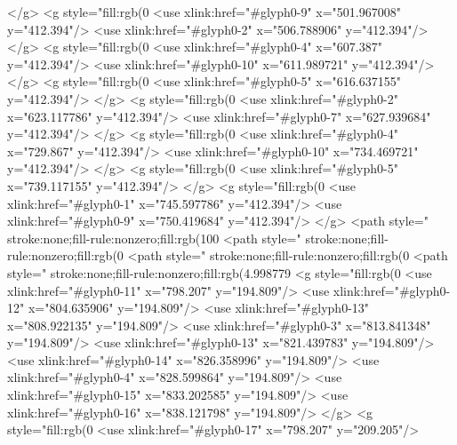 </g>
<g style="fill:rgb(0%
  <use xlink:href="#glyph0-9" x="501.967008" y="412.394"/>
  <use xlink:href="#glyph0-2" x="506.788906" y="412.394"/>
</g>
<g style="fill:rgb(0%
  <use xlink:href="#glyph0-4" x="607.387" y="412.394"/>
  <use xlink:href="#glyph0-10" x="611.989721" y="412.394"/>
</g>
<g style="fill:rgb(0%
  <use xlink:href="#glyph0-5" x="616.637155" y="412.394"/>
</g>
<g style="fill:rgb(0%
  <use xlink:href="#glyph0-2" x="623.117786" y="412.394"/>
  <use xlink:href="#glyph0-7" x="627.939684" y="412.394"/>
</g>
<g style="fill:rgb(0%
  <use xlink:href="#glyph0-4" x="729.867" y="412.394"/>
  <use xlink:href="#glyph0-10" x="734.469721" y="412.394"/>
</g>
<g style="fill:rgb(0%
  <use xlink:href="#glyph0-5" x="739.117155" y="412.394"/>
</g>
<g style="fill:rgb(0%
  <use xlink:href="#glyph0-1" x="745.597786" y="412.394"/>
  <use xlink:href="#glyph0-9" x="750.419684" y="412.394"/>
</g>
<path style=" stroke:none;fill-rule:nonzero;fill:rgb(100%
<path style=" stroke:none;fill-rule:nonzero;fill:rgb(0%
<path style=" stroke:none;fill-rule:nonzero;fill:rgb(0%
<path style=" stroke:none;fill-rule:nonzero;fill:rgb(4.998779%
<g style="fill:rgb(0%
  <use xlink:href="#glyph0-11" x="798.207" y="194.809"/>
  <use xlink:href="#glyph0-12" x="804.635906" y="194.809"/>
  <use xlink:href="#glyph0-13" x="808.922135" y="194.809"/>
  <use xlink:href="#glyph0-3" x="813.841348" y="194.809"/>
  <use xlink:href="#glyph0-13" x="821.439783" y="194.809"/>
  <use xlink:href="#glyph0-14" x="826.358996" y="194.809"/>
  <use xlink:href="#glyph0-4" x="828.599864" y="194.809"/>
  <use xlink:href="#glyph0-15" x="833.202585" y="194.809"/>
  <use xlink:href="#glyph0-16" x="838.121798" y="194.809"/>
</g>
<g style="fill:rgb(0%
  <use xlink:href="#glyph0-17" x="798.207" y="209.205"/>
